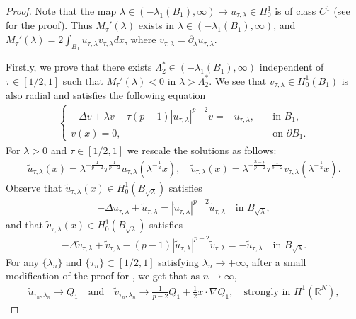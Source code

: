 \documentclass[10pt,a4paper]{article}
\theoremstyle{definition} \theoremstyle{remark}
\numberwithin{equation}{section}
\newcommand{\R}{\mathbb{R}}
\newcommand{\la}{\lambda}
\newcommand{\La}{\Lambda}
\begin{document}
\begin{proof}
	Note that the map $\la \in (-\la_1(B_1),\infty) \mapsto u_{\tau,\la} \in H_0^1$ is of class $C^1$ (see \cite[Corollary 2.4]{Song} for the proof). Thus $M_\tau'(\la)$ exists in $\la \in (-\la_1(B_1),\infty)$, and $M_\tau'(\la) = 2\int_{B_1}u_{\tau,\la}v_{\tau,\la}dx$, where $v_{\tau,\la} = \partial_\la u_{\tau,\la}$.
	
	Firstly, we prove that there exists $\La_2^* \in (-\la_1(B_1),\infty)$ independent of $\tau \in [1/2,1]$ such that $M_\tau'(\la) < 0$ in $\la > \La_2^*$. We see that $v_{\tau,\la} \in H_0^1(B_1)$ is also radial and satisfies the following equation
	\begin{align*}
		\begin{cases}
			-\Delta v + \la v - \tau(p-1)|u_{\tau,\la}|^{p-2}v = -u_{\tau,\la}, & \quad \text{in } B_1, \\
			v(x) = 0, & \quad \text{on } \partial B_1.
		\end{cases}
	\end{align*}
    For $\la > 0$ and $\tau \in [1/2,1]$ we rescale the solutions as follows:
    \begin{align*}
    	\tilde{u}_{\tau,\la}(x) = \la^{-\frac1{p-2}}\tau^{\frac{1}{p-2}}u_{\tau,\la}(\la^{-\frac12}x), \quad \tilde{v}_{\tau,\la}(x) = \la^{-\frac{3-p}{p-2}}\tau^{\frac{1}{p-2}}v_{\tau,\la}(\la^{-\frac12}x).
    \end{align*}
    Observe that $\tilde{u}_{\tau,\la}(x) \in H_0^1(B_{\sqrt{\la}})$ satisfies
    \begin{align*}
    	-\Delta \tilde{u}_{\tau,\la} + \tilde{u}_{\tau,\la} = |\tilde{u}_{\tau,\la}|^{p-2}\tilde{u}_{\tau,\la} \quad \text{in } B_{\sqrt{\la}},
    \end{align*}
    and that $\tilde{v}_{\tau,\la}(x) \in H_0^1(B_{\sqrt{\la}})$ satisfies
    \begin{align*}
    	-\Delta \tilde{v}_{\tau,\la} + \tilde{v}_{\tau,\la} - (p-1)|\tilde{u}_{\tau,\la}|^{p-2}\tilde{v}_{\tau,\la} = -\tilde{u}_{\tau,\la} \quad \text{in } B_{\sqrt{\la}}.
    \end{align*}
	For any $\{\la_n\}$ and $\{\tau_n\} \subset [1/2,1]$ satisfying $\la_n \to +\infty$, after a small modification of the proof for \cite[Proposition 11]{FSK}, we get that as $n \to \infty$,
	\begin{align*}
		\tilde{u}_{\tau_n,\la_n} \to Q_1  \quad \text{and} \quad \tilde{v}_{\tau_n,\la_n} \to \frac{1}{p-2}Q_1 + \frac12 x \cdot \nabla Q_1, \quad \text{strongly in } H^1(\R^N),
	\end{align*}

\end{proof}
\end{document}
